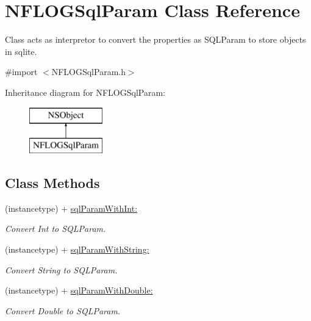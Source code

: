 \hypertarget{interface_n_f_l_o_g_sql_param}{}\section{N\+F\+L\+O\+G\+Sql\+Param Class Reference}
\label{interface_n_f_l_o_g_sql_param}


Class acts as interpretor to convert the properties as S\+Q\+L\+Param to store objects in sqlite.  




{\ttfamily \#import $<$N\+F\+L\+O\+G\+Sql\+Param.\+h$>$}

Inheritance diagram for N\+F\+L\+O\+G\+Sql\+Param\+:\begin{figure}[H]
\begin{center}
\leavevmode
\includegraphics[height=2.000000cm]{interface_n_f_l_o_g_sql_param}
\end{center}
\end{figure}
\subsection*{Class Methods}
\begin{DoxyCompactItemize}
\item 
\mbox{\label{interface_n_f_l_o_g_sql_param_a995d619df1c193ae4b6940c100098621}} 
(instancetype) + \hyperlink{interface_n_f_l_o_g_sql_param_a995d619df1c193ae4b6940c100098621}{sql\+Param\+With\+Int\+:}
\begin{DoxyCompactList}\small\item\em Convert Int to S\+Q\+L\+Param. \end{DoxyCompactList}\item 
\mbox{\label{interface_n_f_l_o_g_sql_param_af1d837ff887168e88a51ee37e72e61e5}} 
(instancetype) + \hyperlink{interface_n_f_l_o_g_sql_param_af1d837ff887168e88a51ee37e72e61e5}{sql\+Param\+With\+String\+:}
\begin{DoxyCompactList}\small\item\em Convert String to S\+Q\+L\+Param. \end{DoxyCompactList}\item 
\mbox{\label{interface_n_f_l_o_g_sql_param_a80737667330084589a0a02dec8860c7a}} 
(instancetype) + \hyperlink{interface_n_f_l_o_g_sql_param_a80737667330084589a0a02dec8860c7a}{sql\+Param\+With\+Double\+:}
\begin{DoxyCompactList}\small\item\em Convert Double to S\+Q\+L\+Param. \end{DoxyCompactList}\end{DoxyCompactItemize}
